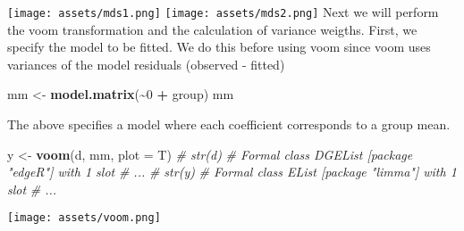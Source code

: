\documentclass[
]{article}
\newenvironment{Shaded}{\begin{snugshade}}{\end{snugshade}}
\newcommand{\AttributeTok}[1]{\textcolor[rgb]{0.13,0.29,0.53}{#1}}
\newcommand{\CommentTok}[1]{\textcolor[rgb]{0.56,0.35,0.01}{\textit{#1}}}
\newcommand{\DecValTok}[1]{\textcolor[rgb]{0.00,0.00,0.81}{#1}}
\newcommand{\FunctionTok}[1]{\textcolor[rgb]{0.13,0.29,0.53}{\textbf{#1}}}
\newcommand{\NormalTok}[1]{#1}
\newcommand{\OtherTok}[1]{\textcolor[rgb]{0.56,0.35,0.01}{#1}}
\newcommand{\SpecialCharTok}[1]{\textcolor[rgb]{0.81,0.36,0.00}{\textbf{#1}}}
\begin{document}
\texttt{[image: assets/mds1.png]}
\texttt{[image: assets/mds2.png]}
Next we will perform the voom transformation and the calculation of
variance weigths. First, we specify the model to be fitted. We do this
before using voom since voom uses variances of the model residuals
(observed - fitted)

\begin{Shaded}
\begin{Highlighting}[]
\NormalTok{mm }\OtherTok{\textless{}{-}} \FunctionTok{model.matrix}\NormalTok{(}\SpecialCharTok{\textasciitilde{}}\DecValTok{0} \SpecialCharTok{+}\NormalTok{ group)}
\NormalTok{mm}
\end{Highlighting}
\end{Shaded}

\begin{Shaded}
\end{Shaded}

The above specifies a model where each coefficient corresponds to a
group mean.

\begin{Shaded}
\begin{Highlighting}[]
\NormalTok{y }\OtherTok{\textless{}{-}} \FunctionTok{voom}\NormalTok{(d, mm, }\AttributeTok{plot =}\NormalTok{ T)}
\CommentTok{\# str(d)}
\CommentTok{\# Formal class \textquotesingle{}DGEList\textquotesingle{} [package "edgeR"] with 1 slot}
\CommentTok{\# ...}
\CommentTok{\# str(y)}
\CommentTok{\# Formal class \textquotesingle{}EList\textquotesingle{} [package "limma"] with 1 slot}
\CommentTok{\# ...}
\end{Highlighting}
\end{Shaded}

\texttt{[image: assets/voom.png]}
\end{document}
